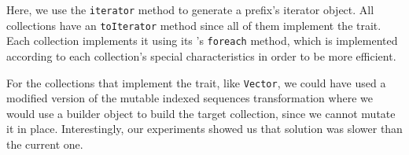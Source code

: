 Here, we use the \texttt{iterator} method to generate a prefix's iterator object. All
collections have an \texttt{toIterator} method since all of them implement the
 trait. Each collection implements it using its
's \texttt{foreach} method, which is implemented according to
each collection's special characteristics in order to be more efficient.

For the collections that implement the  trait, like \texttt{Vector},
we could have used a modified version of the mutable indexed sequences
transformation where we would use a builder object to build the target
collection, since we cannot mutate it in place. Interestingly, our experiments
showed us that solution was slower than the current one.